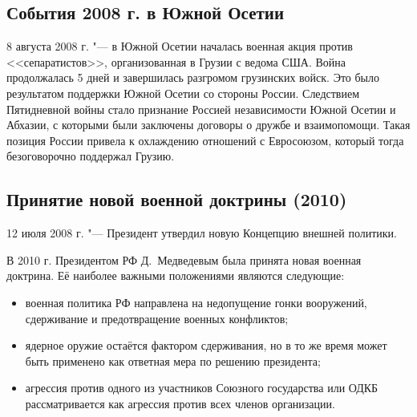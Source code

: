 \subsection{События 2008 г. в Южной Осетии}
8 августа 2008 г. "--- в Южной Осетии началась военная акция против <<сепаратистов>>, организованная в Грузии с ведома США. Война продолжалась 5 дней и завершилась разгромом грузинских войск. Это было результатом поддержки Южной Осетии со стороны России. Следствием Пятидневной войны стало признание Россией независимости Южной Осетии и Абхазии, с которыми были заключены договоры о дружбе и взаимопомощи. Такая позиция России привела к охлаждению отношений с Евросоюзом, который тогда безоговорочно поддержал Грузию.

\subsection{Принятие новой военной доктрины (2010)}
12 июля 2008 г. "--- Президент утвердил новую Концепцию внешней политики.

В 2010 г. Президентом РФ Д.~Медведевым была принята новая военная доктрина. Её наиболее важными положениями являются следующие:

\begin{itemize}
\item военная политика РФ направлена на недопущение гонки вооружений, сдерживание и предотвращение военных конфликтов;
\item ядерное оружие остаётся фактором сдерживания, но в то же время может быть применено как ответная мера по решению президента;
\item агрессия против одного из участников Союзного государства или ОДКБ рассматривается как агрессия против всех членов организации.
\end{itemize}

